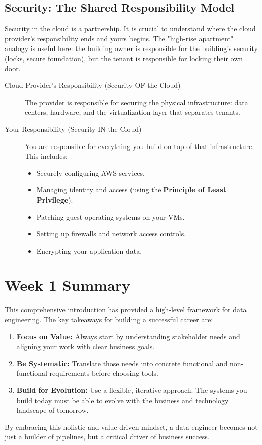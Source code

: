 \documentclass{article}
\begin{document}
\subsection{Security: The Shared Responsibility Model}
Security in the cloud is a partnership. It is crucial to understand where the cloud provider's responsibility ends and yours begins. The "high-rise apartment" analogy is useful here: the building owner is responsible for the building's security (locks, secure foundation), but the tenant is responsible for locking their own door.
\begin{description}
    \item[Cloud Provider's Responsibility (Security OF the Cloud)] The provider is responsible for securing the physical infrastructure: data centers, hardware, and the virtualization layer that separates tenants.
    \item[Your Responsibility (Security IN the Cloud)] You are responsible for everything you build on top of that infrastructure. This includes:
    \begin{itemize}
        \item Securely configuring AWS services.
        \item Managing identity and access (using the \textbf{Principle of Least Privilege}).
        \item Patching guest operating systems on your VMs.
        \item Setting up firewalls and network access controls.
        \item Encrypting your application data.
    \end{itemize}
\end{description}


\section{Week 1 Summary}
This comprehensive introduction has provided a high-level framework for data engineering. The key takeaways for building a successful career are:
\begin{enumerate}
    \item \textbf{Focus on Value:} Always start by understanding stakeholder needs and aligning your work with clear business goals.
    \item \textbf{Be Systematic:} Translate those needs into concrete functional and non-functional requirements before choosing tools.
    \item \textbf{Build for Evolution:} Use a flexible, iterative approach. The systems you build today must be able to evolve with the business and technology landscape of tomorrow.
\end{enumerate}
By embracing this holistic and value-driven mindset, a data engineer becomes not just a builder of pipelines, but a critical driver of business success.
\end{document}
